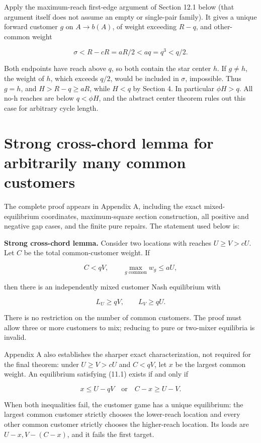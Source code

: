 \documentclass[11pt,a4paper]{article}
\begin{document}
Apply the maximum-reach first-edge argument of Section 12.1 below (that argument itself does not assume an empty or single-pair family). It gives a unique forward customer \(g\) on \(A\to b(A)\), of weight exceeding \(R-q\), and other-common weight

\[
\sigma<R-cR=aR/2<aq=q^3<q/2.
\]

Both endpoints have reach above \(q\), so both contain the star center \(h\). If \(g\ne h\), the weight of \(h\), which exceeds \(q/2\), would be included in \(\sigma\), impossible. Thus \(g=h\), and \(H>R-q\ge aR\), while \(H<q\) by Section 4. In particular \(\phi H>q\). All no-h reaches are below \(q<\phi H\), and the abstract center theorem rules out this case for arbitrary cycle length.

\hypertarget{strong-cross-chord-lemma-for-arbitrarily-many-common-customers}{%
\section{Strong cross-chord lemma for arbitrarily many common customers}\label{strong-cross-chord-lemma-for-arbitrarily-many-common-customers}}

The complete proof appears in Appendix A, including the exact mixed-equilibrium coordinates, maximum-square section construction, all positive and negative gap cases, and the finite pure repairs. The statement used below is:

\textbf{Strong cross-chord lemma.} Consider two locations with reaches \(U\ge V>cU\). Let \(C\) be the total common-customer weight. If

\[
C<qV,\qquad \max_{g\text{ common}}w_g\le aU,
\]

then there is an independently mixed customer Nash equilibrium with

\[
L_U\ge qV,\qquad L_V\ge qU. \tag{11.1}
\]

There is no restriction on the number of common customers. The proof must allow three or more customers to mix; reducing to pure or two-mixer equilibria is invalid.

Appendix A also establishes the sharper exact characterization, not required for the final theorem: under \(U\ge V>cU\) and \(C<qV\), let \(x\) be the largest common weight. An equilibrium satisfying (11.1) exists if and only if

\[
x\le U-qV\quad\text{or}\quad C-x\ge U-V.
\]

When both inequalities fail, the customer game has a unique equilibrium: the largest common customer strictly chooses the lower-reach location and every other common customer strictly chooses the higher-reach location. Its loads are \(U-x,V-(C-x)\), and it fails the first target.
\end{document}
